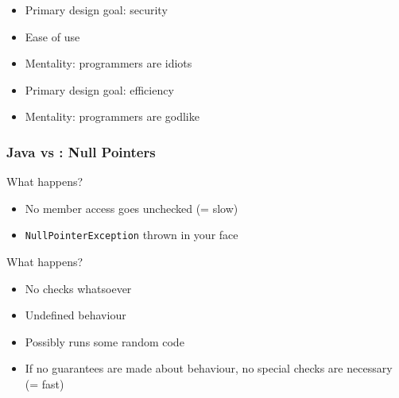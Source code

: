 \begin{frame}
\begin{overprint}
    \begin{itemize}
      \item Primary design goal: security
      \item Ease of use
      \item Mentality: programmers are idiots
    \end{itemize}

    \begin{itemize}
      \item Primary design goal: efficiency
      \item Mentality: programmers are godlike
    \end{itemize}
  \end{overprint}
\end{frame}

\begin{frame}
  \frametitle{Java vs \cpp: Null Pointers}
  \begin{overprint}
    \begin{center}
      What happens?
    \end{center}

    \begin{itemize}
      \item No member access goes unchecked (= slow)
      \item \texttt{NullPointerException} thrown in your face
    \end{itemize}
  \end{overprint}
  \vskip2mm
  \structure{\cpp}
  \begin{overprint}
    \begin{center}
      What happens?
    \end{center}

    \begin{itemize}
      \item No checks whatsoever
      \item Undefined behaviour
      \item Possibly runs some random code
      \item If no guarantees are made about behaviour, no special checks are necessary (= fast)
    \end{itemize}
  \end{overprint}
\end{frame}

